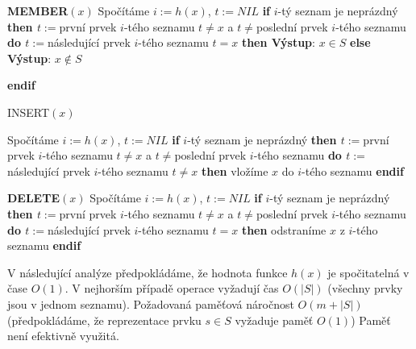\documentclass[a4paper,12pt]{article}
\begin{document}
{\bf MEMBER$(x)$}\newline 
Spočítáme $i:=h(x)$, $t:=NIL$\newline 
{\bf if} $i$-tý seznam je neprázdný {\bf then\newline 
\phantom{{\rm ---}}$t:=$}první prvek $i$-tého seznamu\newline 
\phantom{---}{\bf while} $t\ne x$ a $t\ne$poslední prvek $i$-tého seznamu {\bf do\newline 
\phantom{{\rm ------}}$t:=$}následující prvek $i$-tého seznamu\newline 
\phantom{---}{\bf enddo\newline 
endif\newline 
if} $t=x$ {\bf then Výstup}: $x\in S$ {\bf else Výstup}: $x\notin 
S$ {\bf endif

INSERT$(x)$}\newline 
Spočítáme $i:=h(x)$, $t:=NIL$\newline 
{\bf if} $i$-tý seznam je neprázdný {\bf then\newline 
\phantom{{\rm ---}}$t:=$}první prvek $i$-tého seznamu\newline 
\phantom{---}{\bf while} $t\ne x$ a $t\ne$poslední prvek $i$-tého seznamu {\bf do\newline 
\phantom{{\rm ------}}$t:=$}následující prvek $i$-tého seznamu\newline 
\phantom{---}{\bf enddo\newline 
endif\newline 
if} $t\ne x$ {\bf then} vložíme $x$ do $i$-tého seznamu {\bf endif}

{\bf DELETE}$(x)$\newline 
Spočítáme $i:=h(x)$, $t:=NIL$\newline 
{\bf if} $i$-tý seznam je neprázdný {\bf then\newline 
\phantom{{\rm ---}}$t:=$}první prvek $i$-tého seznamu\newline 
\phantom{---}{\bf while} $t\ne x$ a $t\ne$poslední prvek $i$-tého seznamu {\bf do\newline 
\phantom{{\rm ------}}$t:=$}následující prvek $i$-tého seznamu\newline 
\phantom{---}{\bf enddo\newline 
endif\newline 
if} $t=x$ {\bf then} odstraníme $x$ z $i$-tého seznamu {\bf endif}

V následující analýze předpokládáme, že hodnota funkce $
h(x)$ 
je spočitatelná v čase $O(1)$.\newline 
V nejhorším případě operace vyžadují čas $
O(|S|)$ 
(všechny prv\-ky jsou v jednom seznamu). \newline 
Požadovaná pamě\v tová náročnost $O(m+|S|)$ 
(předpokládáme, že reprezentace prvku $s\in S$ vyžaduje pamě\v t $
O(1)$)\newline 
Pamě\v t není efektivně využitá.
\end{document}
